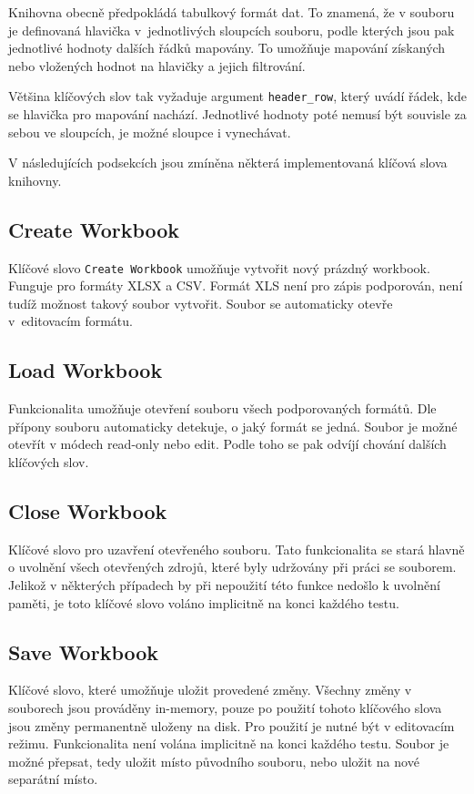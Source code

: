 Knihovna obecně předpokládá tabulkový formát dat. To znamená, že v souboru je definovaná hlavička v~jednotlivých sloupcích souboru, podle kterých jsou pak jednotlivé hodnoty dalších řádků mapovány. To umožňuje mapování získaných nebo vložených hodnot na hlavičky a jejich filtrování.

Většina klíčových slov tak vyžaduje argument \texttt{header\_row}, který uvádí řádek, kde se hlavička pro mapování nachází. Jednotlivé hodnoty poté nemusí být souvisle za sebou ve sloupcích, je možné sloupce i vynechávat.

V následujících podsekcích jsou zmíněna některá implementovaná klíčová slova knihovny.

\subsection{Create Workbook}
Klíčové slovo \texttt{Create Workbook} umožňuje vytvořit nový prázdný workbook. Funguje pro formáty XLSX a CSV. Formát XLS není pro zápis podporován, není tudíž možnost takový soubor vytvořit. Soubor se automaticky otevře v~editovacím formátu.

\subsection{Load Workbook}
Funkcionalita umožňuje otevření souboru všech podporovaných formátů. Dle přípony souboru automaticky detekuje, o jaký formát se jedná. Soubor je možné otevřít v módech read-only nebo edit. Podle toho se pak odvíjí chování dalších klíčových slov.

\subsection{Close Workbook}
Klíčové slovo pro uzavření otevřeného souboru. Tato funkcionalita se stará hlavně o uvolnění všech otevřených zdrojů, které byly udržovány při práci se souborem. Jelikož v některých případech by při nepoužití této funkce nedošlo k uvolnění paměti, je toto klíčové slovo voláno implicitně na konci každého testu.

\subsection{Save Workbook}
Klíčové slovo, které umožňuje uložit provedené změny. Všechny změny v souborech jsou prováděny in-memory, pouze po použití tohoto klíčového slova jsou změny permanentně uloženy na disk. Pro použití je nutné být v editovacím režimu. Funkcionalita není volána implicitně na konci každého testu. Soubor je možné přepsat, tedy uložit místo původního souboru, nebo uložit na nové separátní místo.

